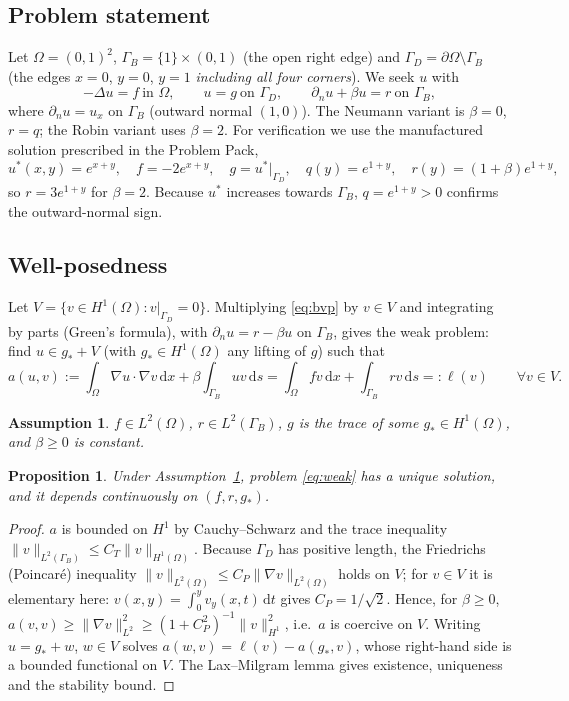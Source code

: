 \documentclass[11pt,a4paper]{article}
\theoremstyle{palplain}
\newtheorem{proposition}[theorem]{Proposition}
\theoremstyle{paldef}
\newtheorem{assumption}[theorem]{Assumption}
\theoremstyle{palremark}
\newcommand{\GD}{\Gamma_D}
\newcommand{\GB}{\Gamma_B}
\newcommand{\dd}{\,\mathrm{d}}
\begin{document}
\subsection{Problem statement}
Let $\Omega=(0,1)^2$, $\GB=\{1\}\times(0,1)$ (the open right edge) and
$\GD=\partial\Omega\setminus\GB$ (the edges $x=0$, $y=0$, $y=1$ \emph{including all four
corners}). We seek $u$ with
\begin{equation}\label{eq:bvp}
-\Delta u = f \ \text{in }\Omega,\qquad u=g\ \text{on }\GD,\qquad
\partial_n u+\beta u = r\ \text{on }\GB,
\end{equation}
where $\partial_n u=u_x$ on $\GB$ (outward normal $(1,0)$). The Neumann variant is
$\beta=0$, $r=q$; the Robin variant uses $\beta=2$. For verification we use the
manufactured solution prescribed in the Problem Pack,
\begin{equation}\label{eq:mms}
u^*(x,y)=e^{x+y},\quad f=-2e^{x+y},\quad g=u^*|_{\GD},\quad q(y)=e^{1+y},\quad r(y)=(1+\beta)e^{1+y},
\end{equation}
so $r=3e^{1+y}$ for $\beta=2$. Because $u^*$ increases towards $\GB$, $q=e^{1+y}>0$
confirms the outward-normal sign.

\subsection{Well-posedness}
Let $V=\{v\in H^1(\Omega): v|_{\GD}=0\}$. Multiplying \eqref{eq:bvp} by $v\in V$ and
integrating by parts (Green's formula), with $\partial_n u=r-\beta u$ on $\GB$,
gives the weak problem: find $u\in g_\ast+V$ (with $g_\ast\in H^1(\Omega)$ any lifting of $g$) such that
\begin{equation}\label{eq:weak}
a(u,v):=\int_\Omega\nabla u\cdot\nabla v\dd x+\beta\int_{\GB}uv\dd s
=\int_\Omega fv\dd x+\int_{\GB}rv\dd s=:\ell(v)\qquad\forall v\in V.
\end{equation}

\begin{assumption}\label{ass:data}
$f\in L^2(\Omega)$, $r\in L^2(\GB)$, $g$ is the trace of some $g_\ast\in H^1(\Omega)$, and
$\beta\ge 0$ is constant.
\end{assumption}

\begin{proposition}\label{prop:wellposed}
Under Assumption~\ref{ass:data}, problem \eqref{eq:weak} has a unique solution, and it
depends continuously on $(f,r,g_\ast)$.
\end{proposition}
\begin{proof}
$a$ is bounded on $H^1$ by Cauchy--Schwarz and the trace inequality
$\|v\|_{L^2(\GB)}\le C_T\|v\|_{H^1(\Omega)}$. Because $\GD$ has positive
length, the Friedrichs (Poincaré) inequality $\|v\|_{L^2(\Omega)}\le C_P\|\nabla v\|_{L^2(\Omega)}$
holds on $V$; for $v\in V$ it is elementary here: $v(x,y)=\int_0^y v_y(x,t)\dd t$ gives
$C_P=1/\sqrt2$. Hence, for $\beta\ge 0$,
$a(v,v)\ge\|\nabla v\|^2_{L^2}\ge(1+C_P^2)^{-1}\|v\|^2_{H^1}$, i.e.\ $a$ is coercive on $V$.
Writing $u=g_\ast+w$, $w\in V$ solves $a(w,v)=\ell(v)-a(g_\ast,v)$, whose right-hand side is
a bounded functional on $V$. The Lax--Milgram lemma \cite{evans} gives existence,
uniqueness and the stability bound.
\end{proof}
\end{document}
